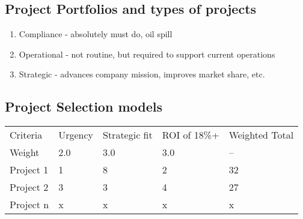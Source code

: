 \documentclass[8pt, letter]{extarticle}
\begin{document}
\begin{multicols}{2}
    \subsection{Project Portfolios and types of projects}
    \begin{enumerate}
        \item Compliance - absolutely must do, oil spill
        \item Operational - not routine, but required to support current operations
        \item Strategic - advances company mission, improves market share, etc.
    \end{enumerate}

    \subsection{Project Selection models}
    \begin{tabular}{ l l l l l }
        Criteria    & Urgency & Strategic fit & ROI of 18\%+ & Weighted Total     \\
        Weight      & 2.0   & 3.0   & 3.0   & --    \\
        Project 1   & 1     & 8     & 2     & 32    \\
        Project 2   & 3     & 3     & 4     & 27    \\
        Project n   & x     & x     & x     & x     \\
    \end{tabular}

\end{multicols}
\end{document}
